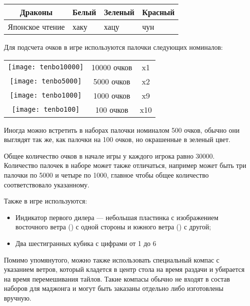\vspace{1cm}

\noindent\begin{tabular}{ cC{2cm}C{2cm}C{2cm} } 
	\toprule
	 \rule[0ex]{0pt}{7ex} Драконы &  \newline Белый &  \newline Зеленый &  \newline Красный \\
	\midrule
	Японское чтение & хаку & хацу & чун \\
	\bottomrule
\end{tabular}

\pagebreak

Для подсчета очков в игре используются палочки следующих номиналов:

\noindent\begin{tabular}{ ccc } 
	\toprule
	\texttt{[image: tenbo10000]} & 10000 очков & x1 \\
	\texttt{[image: tenbo5000]} & 5000 очков & x2 \\
	\texttt{[image: tenbo1000]} & 1000 очков & x9 \\
	\texttt{[image: tenbo100]} & 100 очков & x10 \\
	\bottomrule
\end{tabular}

Иногда можно встретить в наборах палочки номиналом 500 очков, обычно они выглядят так же, как палочки на 100 очков, но окрашенные в зеленый цвет.

Общее количество очков в начале игры у каждого игрока равно 30000. Количество палочек в наборе может также отличаться, например может быть три палочки по 5000 и четыре по 1000, главное чтобы общее количество соответствовало указанному.

Также в игре используются:
\begin{itemize}
	\item Индикатор первого дилера --- небольшая пластинка с изображением восточного ветра () с одной стороны и южного ветра () с другой;
	\item Два шестигранных кубика с цифрами от 1 до 6
\end{itemize}

Помимо упомянутого, можно также использовать специальный компас с указанием ветров, который кладется в центр стола на время раздачи и убирается на время перемешивания тайлов. Такие компасы обычно не входят в состав наборов для маджонга и могут быть заказаны отдельно либо изготовлены вручную.

